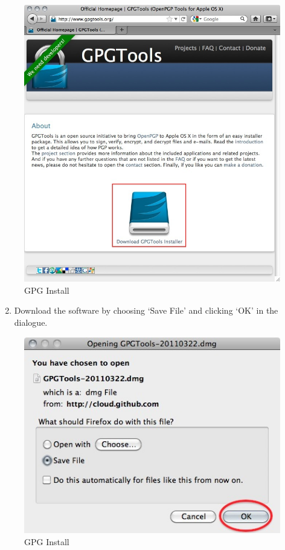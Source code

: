 \begin{figure}[htbp]
\centering
\includegraphics{gpg_mac_inst_1.jpg}
\caption{GPG Install}
\end{figure}

\begin{enumerate}[1.]
\setcounter{enumi}{1}
\item
  Download the software by choosing `Save File' and clicking `OK' in the
  dialogue.
\end{enumerate}
\begin{figure}[htbp]
\centering
\includegraphics{gpg_mac_inst_2.jpg}
\caption{GPG Install}
\end{figure}

